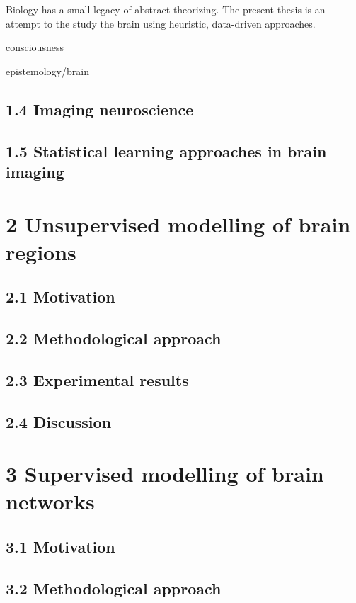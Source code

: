 \documentclass[authoryear,review,3p]{elsarticle}
\begin{document}
Biology has a small legacy of abstract theorizing.
The present thesis is an attempt to the study the brain using
heuristic, data-driven approaches.



consciousness


epistemology/brain




\subsection*{1.4 Imaging neuroscience}






\subsection*{1.5 Statistical learning approaches in brain imaging}



\section*{2 Unsupervised modelling of brain regions}

\subsection*{2.1 Motivation}
\subsection*{2.2 Methodological approach}
\subsection*{2.3 Experimental results}
\subsection*{2.4 Discussion}



\section*{3 Supervised modelling of brain networks}

\subsection*{3.1 Motivation}
\subsection*{3.2 Methodological approach}
\end{document}

